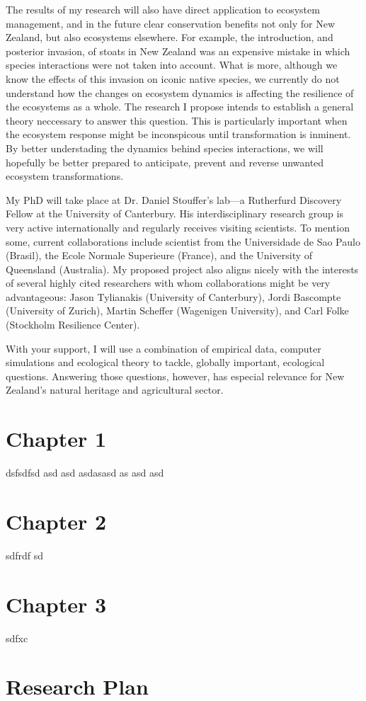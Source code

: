 \documentclass[a4paper]{report}
\begin{document}
The results of my research will also have direct application to ecosystem management, and in the future clear conservation benefits not only for New Zealand, but also ecosystems elsewhere. 
For example, the introduction, and posterior invasion, of stoats in New Zealand was an expensive mistake in which species interactions were not taken into account. 
What is more, although we know the effects of this invasion on iconic native species, we currently do not understand how the changes on ecosystem dynamics is affecting the resilience of the ecosystems as a whole.
The research I propose intends to establish a general theory neccessary to answer this question. 
This is particularly important when the ecosystem response might be inconspicous until transformation is inminent.
By better understading the dynamics behind species interactions, we will hopefully be better prepared to anticipate, prevent and reverse unwanted ecosystem transformations.

My PhD will take place at Dr. Daniel Stouffer's lab---a Rutherfurd Discovery Fellow at the University of Canterbury. 
His interdisciplinary research group is very active internationally and regularly receives visiting scientists. 
To mention some, current collaborations include scientist from the Universidade de Sao Paulo (Brasil), the Ecole Normale Superieure (France), and the University of Queensland (Australia). 
My proposed project also aligns nicely with the interests of several highly cited researchers with whom collaborations might be very advantageous: Jason Tylianakis (University of Canterbury), Jordi Bascompte (University of Zurich), Martin Scheffer (Wagenigen University), and Carl Folke (Stockholm Resilience Center). 

With your support, I will use a combination of empirical data, computer simulations and ecological theory to tackle, globally important, ecological questions. Answering those questions, however, has especial relevance for New Zealand's natural heritage and agricultural sector. 

\chapter*{Chapter 1}

dsfsdfsd asd asd asdasasd as asd asd

\chapter*{Chapter 2}

sdfrdf sd

\chapter*{Chapter 3}

sdfxc 

\chapter*{Research Plan}



\end{document}
